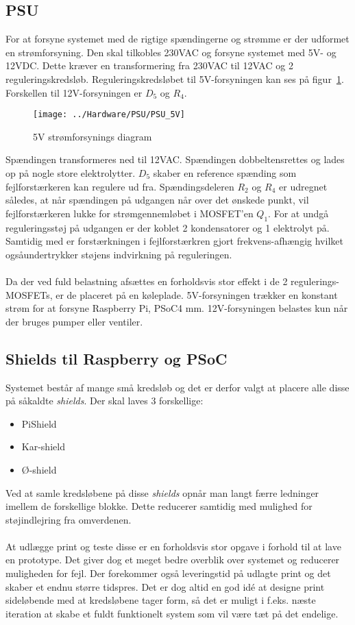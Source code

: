\subsection{PSU}
For at forsyne systemet med de rigtige spændingerne og strømme er der udformet en strømforsyning. Den skal tilkobles 230VAC og forsyne systemet med 5V- og 12VDC. Dette kræver en transformering fra 230VAC til 12VAC og 2 reguleringskredsløb. Reguleringskredsløbet til 5V-forsyningen kan ses på figur~\ref{photo:PSU_5V}. Forskellen til 12V-forsyningen er $D_5$ og $R_4$.
 
\begin{figure}[H]
	\centering
	\texttt{[image: ../Hardware/PSU/PSU\_5V]}
	\caption{5V strømforsynings diagram}
	\label{photo:PSU_5V}
\end{figure}

Spændingen transformeres ned til 12VAC. Spændingen dobbeltensrettes og lades op på nogle store elektrolytter. $D_5$ skaber en reference spænding som fejlforstærkeren kan regulere ud fra. Spændingsdeleren $R_2$ og $R_4$ er udregnet således, at når spændingen på udgangen når over det ønskede punkt, vil fejlforstærkeren lukke for strømgennemløbet i MOSFET'en $Q_1$. For at undgå reguleringsstøj på udgangen er der koblet 2 kondensatorer og 1 elektrolyt på. Samtidig med er forstærkningen i fejlforstærkren gjort frekvens-afhængig hvilket ogsåundertrykker støjens indvirkning på reguleringen.
\\\\
Da der ved fuld belastning afsættes en forholdsvis stor effekt i de 2 regulerings-MOSFETs, er de placeret på en køleplade. 5V-forsyningen trækker en konstant strøm for at forsyne Raspberry Pi, PSoC4 mm. 12V-forsyningen belastes kun når der bruges pumper eller ventiler.

\subsection{Shields til Raspberry og PSoC}
Systemet består af mange små kredsløb og det er derfor valgt at placere alle disse på såkaldte \emph{shields}. Der skal laves 3 forskellige:

\begin{itemize}
\item PiShield
\item Kar-shield
\item Ø-shield
\end{itemize}

Ved at samle kredsløbene på disse \emph{shields} opnår man langt færre ledninger imellem de forskellige blokke. Dette reducerer samtidig med mulighed for støjindlejring fra omverdenen.
\\\\
At udlægge print og teste disse er en forholdsvis stor opgave i forhold til at lave en prototype. Det giver dog et meget bedre overblik over systemet og reducerer muligheden for fejl. Der forekommer også leveringstid på udlagte print og det skaber et endnu større tidspres. Det er dog altid en god idé at designe print sideløbende med at kredsløbene tager form, så det er muligt i f.eks. næste iteration at skabe et fuldt funktionelt system som vil være tæt på det endelige.